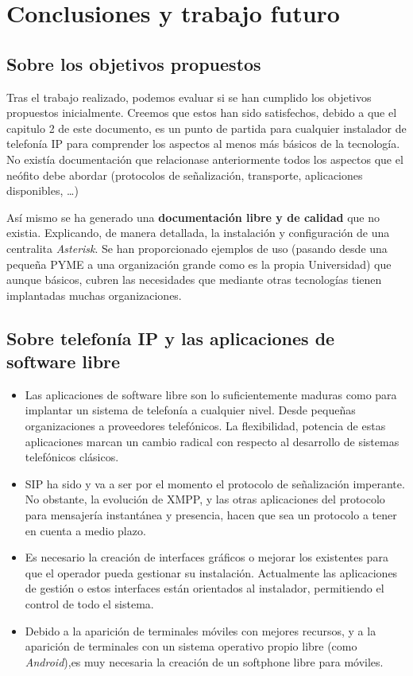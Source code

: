 
\chapter{Conclusiones y trabajo futuro}
\label{cha:concl-y-trab}

\section*{Sobre los objetivos propuestos}

Tras el trabajo realizado, podemos evaluar si se han cumplido los objetivos propuestos inicialmente. Creemos que estos han sido satisfechos, debido a que el capitulo 2 de este documento, es un punto de partida para cualquier instalador de telefonía IP para comprender los aspectos al menos más básicos de la tecnología. No existía documentación que relacionase anteriormente todos los aspectos que el neófito debe abordar (protocolos de señalización, transporte, aplicaciones disponibles, \ldots)

Así mismo se ha generado una \textbf{ documentación libre y de calidad} que no existia. Explicando, de manera detallada, la instalación y configuración de una centralita \emph{Asterisk}. Se han proporcionado ejemplos de uso (pasando desde una pequeña PYME a una organización grande como es la propia Universidad) que aunque básicos, cubren las necesidades que mediante otras tecnologías tienen implantadas muchas organizaciones.

\section*{Sobre telefonía IP y las aplicaciones de software libre}


\begin{itemize}
\item Las aplicaciones de software libre son lo suficientemente maduras como para implantar un sistema de telefonía a cualquier nivel. Desde pequeñas organizaciones a proveedores telefónicos. La flexibilidad, potencia de estas aplicaciones marcan un cambio radical con respecto al desarrollo de sistemas telefónicos clásicos.
\item SIP ha sido y va a ser por el momento el protocolo de señalización imperante. No obstante, la evolución de XMPP, y las otras aplicaciones del protocolo para mensajería instantánea y presencia, hacen que sea un protocolo a tener en cuenta a medio plazo.
\item Es necesario la creación de interfaces gráficos o mejorar los existentes para que el operador pueda gestionar su instalación. Actualmente las aplicaciones de gestión o estos interfaces están orientados al instalador, permitiendo el control de todo el sistema.
\item Debido a la aparición de terminales móviles con mejores recursos, y a la aparición de terminales con un sistema operativo propio libre (como \emph{Android}),es muy necesaria la creación de un softphone libre para móviles.
\end{itemize}


